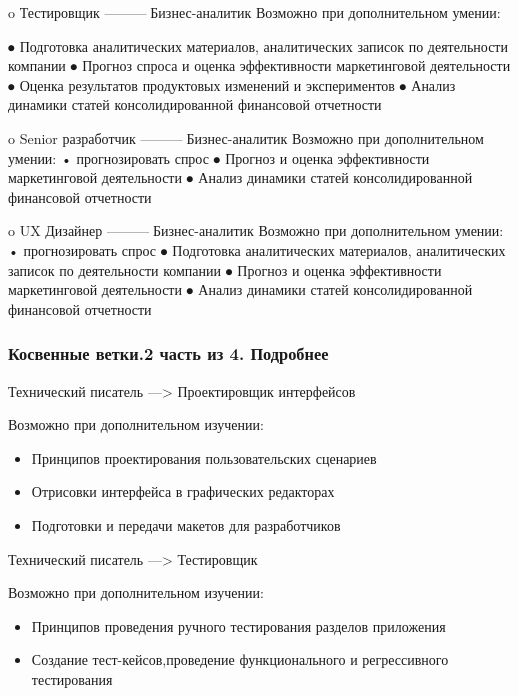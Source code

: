 \documentclass{../industrial-development}
\begin{document}
\lecturenotes
o	Тестировщик ---------Бизнес-аналитик
Возможно при дополнительном умении:

⦁ Подготовка аналитических материалов, аналитических записок по деятельности компании
⦁ Прогноз спроса и оценка эффективности маркетинговой деятельности
⦁ Оценка результатов продуктовых изменений и экспериментов
⦁ Анализ динамики статей консолидированной финансовой отчетности

o	Senior разработчик ---------Бизнес-аналитик
Возможно при дополнительном умении:
•	прогнозировать спрос 
⦁ Прогноз и оценка эффективности маркетинговой деятельности
⦁ Анализ динамики статей консолидированной финансовой отчетности

o	UX Дизайнер ---------Бизнес-аналитик
Возможно при дополнительном умении:
•	прогнозировать спрос 
⦁ Подготовка аналитических материалов, аналитических записок по деятельности компании
⦁ Прогноз и оценка эффективности маркетинговой деятельности
⦁ Анализ динамики статей консолидированной финансовой отчетности





\begin{frame} \frametitle{Косвенные ветки.2 часть из 4. Подробнее}

\begin{block}{Технический писатель ---> Проектировщик интерфейсов}

Возможно при дополнительном изучении:
  \end{block}
\begin{itemize}
  \item Принципов проектирования пользовательских сценариев
  \item Отрисовки интерфейса в графических редакторах
\item Подготовки и передачи макетов для разработчиков
  \end{itemize}

\begin{block}{Технический писатель ---> Тестировщик}

Возможно при дополнительном изучении:
  \end{block}
\begin{itemize}
  \item Принципов проведения ручного тестирования разделов приложения
  \item Создание тест-кейсов,проведение функционального и регрессивного тестирования
  \end{itemize}
\end{frame}
\end{document}
